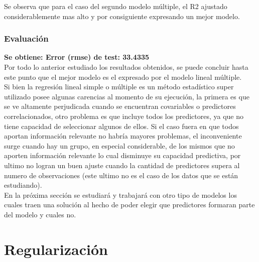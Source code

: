 Se observa que para el caso del segundo modelo múltiple, el R2 ajustado considerablemente mas alto y por consiguiente expresando un mejor modelo.

\subsubsection{Evaluación}
\textbf{Se obtiene: Error (rmse) de test: 33.4335}\\


Por todo lo anterior estudiado los resultados obtenidos, se puede concluir hasta este punto que el mejor modelo es el expresado por el modelo lineal múltiple.\\


Si bien la regresión lineal simple o múltiple es un método estadístico super utilizado posee algunas carencias al momento de su ejecución, la primera es que se ve altamente perjudicada cuando se encuentran covariables o predictores correlacionados, otro problema es que incluye todos los predictores, ya que no tiene capacidad de seleccionar algunos de ellos. Si el caso fuera en que todos aportan información relevante no habría mayores problemas, el inconveniente surge cuando hay un grupo, en especial considerable, de los mismos que no aporten información relevante lo cual disminuye su capacidad predictiva, por ultimo no logran un buen ajuste cuando la cantidad de predictores supera al numero de observaciones (este ultimo no es el caso de los datos que se están estudiando).\\
En la próxima sección se estudiará y trabajará con otro tipo de modelos los cuales traen una solución al hecho de poder elegir que predictores formaran parte del modelo y cuales no.











\section{Regularización}

